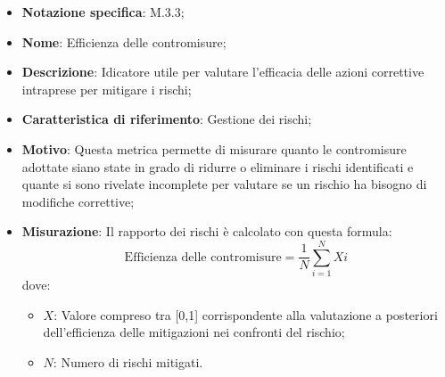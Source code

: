 \begin{itemize}
    \item \textbf{Notazione specifica}: M.3.3;
    \item \textbf{Nome}: Efficienza delle contromisure;
    \item \textbf{Descrizione}: Idicatore utile per valutare l'efficacia delle azioni correttive intraprese per mitigare i rischi;
    \item \textbf{Caratteristica di riferimento}: Gestione dei rischi;
    \item \textbf{Motivo}: Questa metrica permette di misurare quanto le contromisure adottate siano state in grado di ridurre o eliminare i rischi identificati e quante si sono rivelate incomplete per valutare se un rischio ha bisogno di modifiche correttive;
    \item \textbf{Misurazione}: Il rapporto dei rischi è calcolato con questa formula:
    \[
        \text{Efficienza delle contromisure} =\frac{1}{N} \sum_{i=1}^{N} Xi
    \]
    dove:
    \begin{itemize}
        \item $X$: Valore compreso tra [0,1] corrispondente alla valutazione a posteriori dell’efficienza delle mitigazioni nei confronti del rischio;
        \item $N$: Numero di rischi mitigati.
    \end{itemize}
\end{itemize}